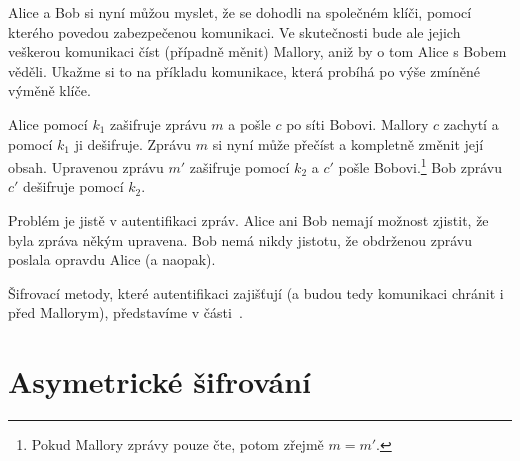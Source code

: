 \documentclass[12pt]{article}
\begin{document}

        Alice a Bob si nyní můžou myslet, že se dohodli na společném klíči, pomocí kterého povedou zabezpečenou komunikaci.
        Ve skutečnosti bude ale jejich veškerou komunikaci číst (případně měnit) Mallory, aniž by o tom Alice s Bobem věděli.
        Ukažme si to na příkladu komunikace, která probíhá po výše zmíněné výměně klíče.

        Alice pomocí $k_1$ zašifruje zprávu $m$ a pošle $c$ po síti Bobovi. Mallory $c$ zachytí a pomocí $k_1$ ji dešifruje.
        Zprávu $m$ si nyní může přečíst a kompletně změnit její obsah.
        Upravenou zprávu $m'$ zašifruje pomocí $k_2$ a $c'$ pošle Bobovi.\footnote{Pokud Mallory zprávy pouze čte, potom zřejmě $m = m'$.}
        Bob zprávu $c'$ dešifruje pomocí $k_2$.

        Problém je jistě v autentifikaci zpráv. Alice ani Bob nemají možnost zjistit, že byla zpráva někým upravena.
        Bob nemá nikdy jistotu, že obdrženou zprávu poslala opravdu Alice (a naopak).

        \medskip

        Šifrovací metody, které autentifikaci zajišťují (a budou tedy komunikaci chránit i před Mallorym), představíme v části~\ref{public-key}.

    
\part{Asymetrické šifrování}\label{public-key}
\end{document}
